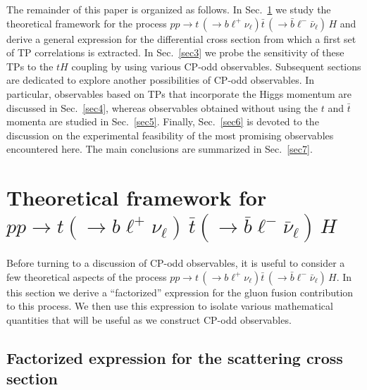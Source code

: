 \documentclass[aps,preprint,tightenlines,floatfix,superscriptaddress,nofootinbib,showpacs]{revtex4-1}
\def\tbar{\bar{t}}
\def\bbar{\bar{b}}
\def\nubar{{\bar{\nu}}_{\ell}}
\def\ppprocess{pp\to t\,\left(\rightarrow b {\ell}^+ \nu_{\ell}\right) \tbar\,\left(\rightarrow\bbar {\ell}^-\nubar\right)\,H}
\begin{document}
The remainder of this paper is organized as follows. In
Sec.~\ref{sec2} we study the theoretical framework for the process
$\ppprocess$ and derive a general expression for the differential
cross section from which a first set of TP correlations is
extracted. In Sec.~\ref{sec3} we probe the sensitivity of these TPs to
the $tH$ coupling by using various $\mathrm{CP}$-odd
observables. Subsequent sections are dedicated to explore another
possibilities of $\mathrm{CP}$-odd observables. In particular,
observables based on TPs that incorporate the Higgs momentum are
discussed in Sec.~\ref{sec4}, whereas observables obtained without
using the $t$ and $\tbar$ momenta are studied in
Sec.~\ref{sec5}. Finally, Sec.~\ref{sec6} is devoted to the discussion
on the experimental feasibility of the most promising observables
encountered here. The main conclusions are summarized in
Sec.~\ref{sec7}.

\setlength{\abovedisplayskip}{10.6pt}
\setlength{\belowdisplayskip}{10.6pt}
\section{Theoretical framework for \MakeLowercase{{\boldmath $pp\to t(\to b {\ell}^+ \nu_{\ell})\,\bar{t}(\to\bar{b} {\ell}^-\bar{\nu}_{\ell})$}}$\,H$}
\label{sec2}

%
Before turning to a discussion of $\mathrm{CP}$-odd observables,
it is useful to consider a few theoretical aspects of
the process $\ppprocess$.  In this section we derive a ``factorized''
expression for the gluon fusion contribution to this process.
We then use this expression to isolate various mathematical quantities
that will be useful as we construct $\mathrm{CP}$-odd observables.

\subsection{Factorized expression for the scattering cross section}
\end{document}
